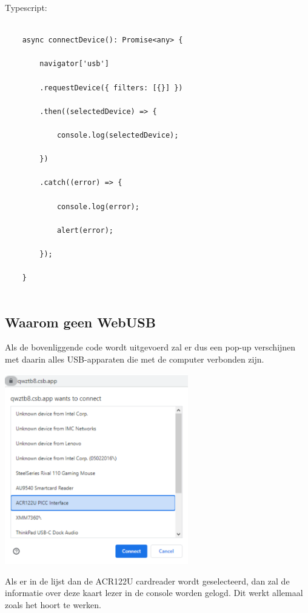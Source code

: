 Typescript: 
\begin{verbatim} 
    
    async connectDevice(): Promise<any> { 
        
        navigator['usb'] 
        
        .requestDevice({ filters: [{}] }) 
        
        .then((selectedDevice) => { 
            
            console.log(selectedDevice); 
            
        }) 
        
        .catch((error) => { 
            
            console.log(error); 
            
            alert(error); 
            
        }); 
        
    } 
    
\end{verbatim} 

\subsection{Waarom geen WebUSB}
Als de bovenliggende code wordt uitgevoerd zal er dus een pop-up verschijnen met daarin alles USB-apparaten die met de computer verbonden zijn.

\begin{center}
    \includegraphics[width=8cm]{device_list}
\end{center}

Als er in de lijst dan de ACR122U cardreader wordt geselecteerd, dan zal de informatie over deze kaart lezer in de console worden gelogd. Dit werkt allemaal zoals het hoort te werken.

